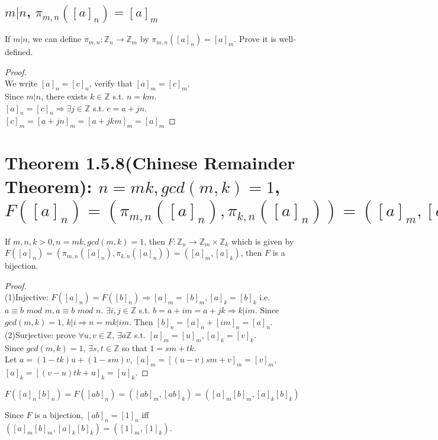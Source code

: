 \documentclass[11pt]{elegantbook}
\begin{document}
\subsection{$m|n$, $\pi_{m,n}([a]_n)=[a]_m$}
\begin{example}[Exercise 1.5.4]
    If $m|n$, we can define $\pi_{m,n}:\mathbb{Z}_n\rightarrow\mathbb{Z}_m$ by $\pi_{m,n}([a]_n)=[a]_m$. Prove it is well-defined.
\end{example}
\begin{proof}
\quad\\
We write $[a]_n=[c]_n$, verify that $[a]_m=[c]_m$.\\
Since $m|n$, there exists $k\in\mathbb{Z}$ s.t. $n=km$.\\
$[a]_n=[c]_n\Rightarrow \exists j\in\mathbb{Z}$ s.t. $c=a+jn$.\\
$[c]_m=[a+jn]_m=[a+jkm]_m=[a]_m$
\end{proof}

\section{Theorem 1.5.8(Chinese Remainder Theorem): $n=mk,gcd(m,k)=1$, $F([a]_n)=(\pi_{m,n}([a]_n),\pi_{k,n}([a]_n))=([a]_m,[a]_k)$}
\begin{theorem}
If $m,n,k>0,n=mk,gcd(m,k)=1$, then $F:\mathbb{Z}_n\rightarrow\mathbb{Z}_m\times\mathbb{Z}_k$ which is given by $F([a]_n)=(\pi_{m,n}([a]_n),\pi_{k,n}([a]_n))=([a]_m,[a]_k)$, then $F$ is a bijection.
\end{theorem}
\begin{proof}
\quad\\
(1)Injective: $F([a]_n)=F([b]_n)\Rightarrow [a]_m=[b]_m,[a]_k=[b]_k$ i.e. $a\equiv b \textit{ mod }m,a\equiv b \textit{ mod }n$. $\exists i,j\in\mathbb{Z}$ s.t. $b=a+im=a+jk\Rightarrow k|im$. Since $gcd(m,k)=1$, $k|i\Rightarrow n=mk|im$. Then $[b]_n=[a]_n+[im]_n=[a]_n$.\\
(2)Surjective: prove $\forall u,v\in\mathbb{Z}$, $\exists a\mathbb{Z}$ s.t. $[a]_m=[u]_m,[a]_k=[v]_k$.\\
Since $gcd(m,k)=1$, $\exists s,t\in \mathbb{Z}$ so that $1=sm+tk$. \\
Let $a=(1-tk)u+(1-sm)v$, $[a]_m=[(u-v)sm+v]_m=[v]_m$, $[a]_k=[(v-u)tk+u]_k=[u]_k$.
\end{proof}
\begin{note}
    $F([a]_n[b]_n)=F([ab]_n)=([ab]_m,[ab]_k)=([a]_m[b]_m,[a]_k[b]_k)$
\end{note}
Since $F$ is a bijection, $[ab]_n=[1]_n$ iff $([a]_m[b]_m,[a]_k[b]_k)=([1]_m,[1]_k)$.
\end{document}
